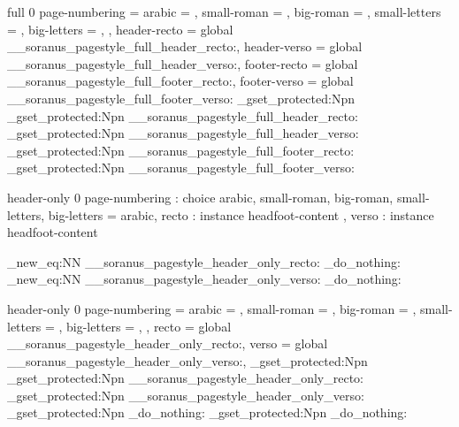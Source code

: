  { full } { 0 }
  {
    page-numbering =
      {
        arabic        = ,
        small-roman   = ,
        big-roman     = ,
        small-letters = ,
        big-letters   = ,
      },
      header-recto = global \__soranus_pagestyle_full_header_recto:,
      header-verso = global \__soranus_pagestyle_full_header_verso:,
      footer-recto = global \__soranus_pagestyle_full_footer_recto:,
      footer-verso = global \__soranus_pagestyle_full_footer_verso:
  }
  {
    \AssignTemplateKeys
    \cs_gset_protected:Npn \@mkboth { \markboth }
    \cs_gset_protected:Npn \@oddhead
      { \__soranus_pagestyle_full_header_recto: }
    \cs_gset_protected:Npn \@evenhead
      { \__soranus_pagestyle_full_header_verso: }
    \cs_gset_protected:Npn \@oddfoot
      { \__soranus_pagestyle_full_footer_recto: }
    \cs_gset_protected:Npn \@evenfoot
      { \__soranus_pagestyle_full_footer_verso: }
  }




 { header-only } { 0 }
  {
    page-numbering : choice
      { arabic, small-roman, big-roman, small-letters, big-letters }
                                         = arabic,
    recto          : instance { headfoot-content },
    verso          : instance { headfoot-content }
  }

\cs_new_eq:NN \__soranus_pagestyle_header_only_recto: \prg_do_nothing:
\cs_new_eq:NN \__soranus_pagestyle_header_only_verso: \prg_do_nothing:

 { header-only } { 0 }
  {
    page-numbering =
      {
        arabic        = ,
        small-roman   = ,
        big-roman     = ,
        small-letters = ,
        big-letters   = ,
      },
      recto        = global \__soranus_pagestyle_header_only_recto:,
      verso        = global \__soranus_pagestyle_header_only_verso:,
  }
  {
    \AssignTemplateKeys
    \cs_gset_protected:Npn \@mkboth { \markboth }
    \cs_gset_protected:Npn \@oddhead
      { \__soranus_pagestyle_header_only_recto: }
    \cs_gset_protected:Npn \@evenhead
      { \__soranus_pagestyle_header_only_verso: }
    \cs_gset_protected:Npn \@oddfoot
      { \prg_do_nothing: }
    \cs_gset_protected:Npn \@evenfoot
      { \prg_do_nothing: }
  }





